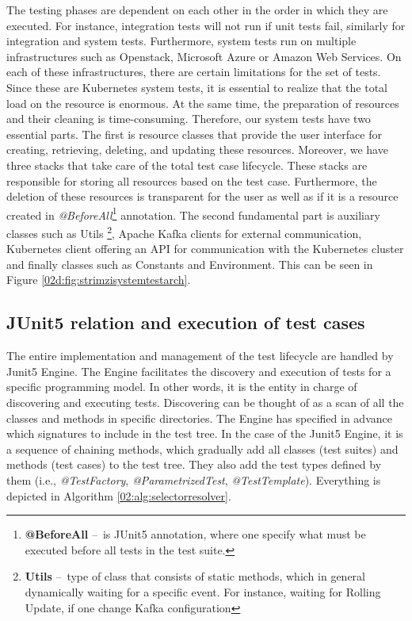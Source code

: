 The testing phases are dependent on each other in the order in which they are executed. For instance, integration tests will not run if unit tests fail, similarly for integration and system tests. Furthermore, system tests run on multiple infrastructures such as Openstack, Microsoft Azure or Amazon Web Services. On each of these infrastructures, there are certain limitations for the set of tests. Since these are Kubernetes system tests, it is essential to realize that the total load on the resource is enormous. At the same time, the preparation of resources and their cleaning is time-consuming. Therefore, our system tests have two essential parts. The first is resource classes that provide the user interface for creating, retrieving, deleting, and updating these resources.
Moreover, we have three stacks that take care of the total test case lifecycle. These stacks are responsible for storing all resources based on the test case. Furthermore, the deletion of these resources is transparent for the user as well as if it is a resource created in \emph{@BeforeAll}\footnote{\textbf{@BeforeAll } \---\ is JUnit5 annotation, where one specify what must be executed before all tests in the test suite.} annotation. The second fundamental part is auxiliary classes such as Utils \footnote {\textbf{Utils} \---\ type of class that consists of static methods, which in general dynamically waiting for a specific event. For instance, waiting for Rolling Update, if one change Kafka configuration}, Apache Kafka clients for external communication, Kubernetes client offering an API for communication with the Kubernetes cluster and finally classes such as Constants and Environment. This can be seen in Figure \ref{02d:fig:strimzisystemtestarch}.

\subsection{JUnit5 relation and execution of test cases}
\label{02:subsec:strimziJunit5relation:execution}

The entire implementation and management of the test lifecycle are handled by Junit5 Engine. The Engine facilitates the discovery and execution of tests for a specific programming model. In other words, it is the entity in charge of discovering and executing tests. Discovering can be thought of as a scan of all the classes and methods in specific directories. The Engine has specified in advance which signatures to include in the test tree. In the case of the Junit5 Engine, it is a sequence of chaining methods, which gradually add all classes (test suites) and methods (test cases) to the test tree. They also add the test types defined by them (i.e., \emph{@TestFactory}, \emph{@ParametrizedTest}, \emph{@TestTemplate}). Everything is depicted in Algorithm \ref{02:alg:selectorresolver}. 

